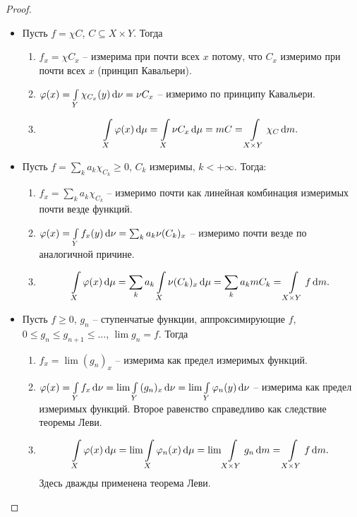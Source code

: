 \begin{proof}
    \enewline
    \begin{itemize}
        \item Пусть $f = \chi{C}$, $C \subseteq X \times Y$. Тогда
            \begin{enumerate}
                \item $f_x = \chi{C_x}$ -- измерима при почти всех $x$ потому, что
                    $C_x$ измеримо при почти всех $x$ (принцип Кавальери).
                \item $\varphi(x) = \int\limits_Y{\chi_{C_x}(y) \,\mathrm{d}\nu} = \nu{C_x}$ -- измеримо по 
                    принципу Кавальери.
                \item
                    \[
                        \int\limits_X{\varphi(x) \,\mathrm{d}\mu} = \int\limits_X{\nu{C_x} \,\mathrm{d}\mu} = m{C} 
                        = \int\limits_{X \times Y}{\chi_C \,\mathrm{d} m}
                    .\]
            \end{enumerate}
        \item Пусть $f = \sum_k{a_k \chi_{C_k}} \geqslant 0$, $C_k$ измеримы, $k < +\infty$. Тогда:
            \begin{enumerate}
                \item $f_x = \sum_k{a_k \chi_{C_k}}$ -- измеримо почти как линейная комбинация
                    измеримых почти везде функций.
                \item $\varphi(x) = \int\limits_Y{f_x(y) \,\mathrm{d}\nu} = \sum_k{a_k \nu{(C_k)_x}}$ -- измеримо почти везде 
                    по аналогичной причине.
                \item 
                    \[
                        \int\limits_X{\varphi(x) \,\mathrm{d}\mu} = \sum_k{a_k \int\limits_X{\nu{(C_k)_x} \,\mathrm{d}\mu}}
                            = \sum_k{a_k m{C_k}} = \int\limits_{X \times Y}{f \,\mathrm{d} m}
                    .\]
            \end{enumerate}
        \item Пусть $f \geqslant 0$, $g_n$ -- ступенчатые функции, аппроксимирующие $f$, 
            $0 \leqslant g_n \leqslant g_{n+1} \leqslant \ldots$, $\lim{g_n} = f$. Тогда
            \begin{enumerate}
                \item $f_x = \lim{(g_n)_x}$ -- измерима как предел измеримых функций.
                \item $\varphi(x) = \int\limits_Y{f_x \,\mathrm{d}\nu} = \lim{\int\limits_Y{(g_n)_x \,\mathrm{d}\nu}} 
                    = \lim{\int\limits_Y{\varphi_n(y) \,\mathrm{d}\nu}}$ -- измерима как предел измеримых функций. 
                    Второе равенство справедливо как следствие теоремы Леви.
                \item 
                    \[
                        \int\limits_X{\varphi(x) \,\mathrm{d}\mu} = \lim{\int\limits_X{\varphi_n(x) \,\mathrm{d}\mu}} = 
                        \lim{\int\limits_{X \times Y}{g_n \,\mathrm{d}m}} = \int\limits_{X \times Y}{f \,\mathrm{d} m}
                    .\]
                    Здесь дважды применена теорема Леви.
            \end{enumerate}
    \end{itemize}
\end{proof}

